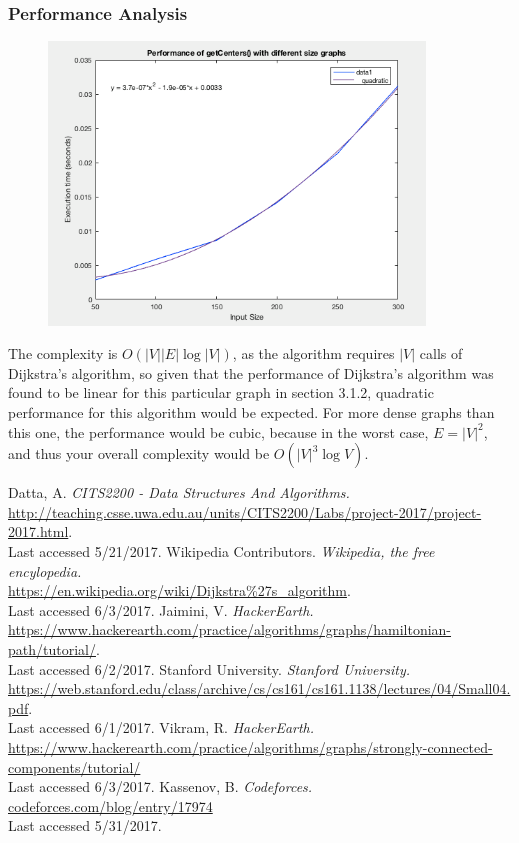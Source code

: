\documentclass[11pt]{article}
\begin{document}
	\subsubsection{Performance Analysis}
	\begin{figure}[h!]
		\centering
		\includegraphics[width=100mm,scale=0.5]{images/centres.png}
	\end{figure}
	The complexity is \(O(|V||E|\log|V|)\), as the algorithm requires \(|V|\) calls of Dijkstra's algorithm, so given that the performance of Dijkstra's algorithm was found to be linear for this particular graph in section 3.1.2, quadratic performance for this algorithm would be expected. For more dense graphs than this one, the performance would be cubic, because in the worst case, \(E = |V|^2\), and thus your overall complexity would be \(O(|V|^3 \log V)\).
	\newpage
	\begin{thebibliography}{9}
		Datta, A. \textit{CITS2200 - Data Structures And Algorithms.} \\\url{http://teaching.csse.uwa.edu.au/units/CITS2200/Labs/project-2017/project-2017.html}. \\Last accessed 5/21/2017.
		Wikipedia Contributors. \textit{Wikipedia, the free encylopedia.} \\\url{https://en.wikipedia.org/wiki/Dijkstra\%27s\_algorithm}.
		\\Last accessed 6/3/2017.
		Jaimini, V. \textit{HackerEarth.} \\\url{https://www.hackerearth.com/practice/algorithms/graphs/hamiltonian-path/tutorial/}. \\Last accessed 6/2/2017.
		Stanford University. \textit{Stanford University.} \\\url{https://web.stanford.edu/class/archive/cs/cs161/cs161.1138/lectures/04/Small04.pdf}. \\Last accessed 6/1/2017.
		Vikram, R. \textit{HackerEarth.} \\\url{https://www.hackerearth.com/practice/algorithms/graphs/strongly-connected-components/tutorial/}
		\\Last accessed 6/3/2017.
		Kassenov, B. \textit{Codeforces.} \\\url{codeforces.com/blog/entry/17974}
		\\Last accessed 5/31/2017.
		
		
		
	\end{thebibliography}	
\end{document}
